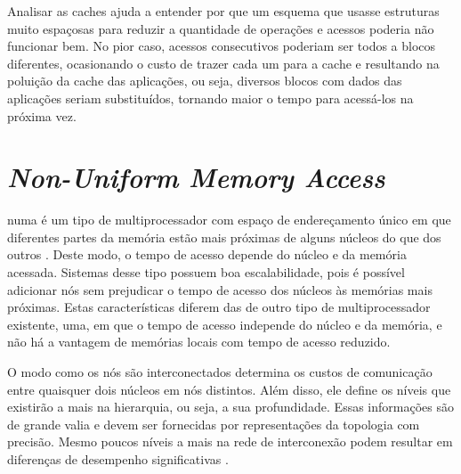 Analisar as caches ajuda a entender por que um esquema que usasse estruturas muito espaçosas para reduzir a quantidade de operações e acessos poderia não funcionar bem.
No pior caso, acessos consecutivos poderiam ser todos a blocos diferentes, ocasionando o custo de trazer cada um para a cache e resultando na poluição da cache das aplicações, ou seja, diversos blocos com dados das aplicações seriam substituídos, tornando maior o tempo para acessá-los na próxima vez.


\section{\textit{Non-Uniform Memory Access}}
\label{sec:numa}

\ac{numa} é um tipo de multiprocessador com espaço de endereçamento único em que diferentes partes da memória estão mais próximas de alguns núcleos do que dos outros \cite{Patterson}.
Deste modo, o tempo de acesso depende do núcleo e da memória acessada.
Sistemas desse tipo possuem boa escalabilidade, pois é possível adicionar nós sem prejudicar o tempo de acesso dos núcleos às memórias mais próximas.
Estas características diferem das de outro tipo de multiprocessador existente, \ac{uma}, em que o tempo de acesso independe do núcleo e da memória, e não há a vantagem de memórias locais com tempo de acesso reduzido.

O modo como os nós são interconectados determina os custos de comunicação entre quaisquer dois núcleos em nós distintos.
Além disso, ele define os níveis que existirão a mais na hierarquia, ou seja, a sua profundidade.
Essas informações são de grande valia e devem ser fornecidas por representações da topologia com precisão.
Mesmo poucos níveis a mais na rede de interconexão podem resultar em diferenças de desempenho significativas \cite{MPITopFunc}.



